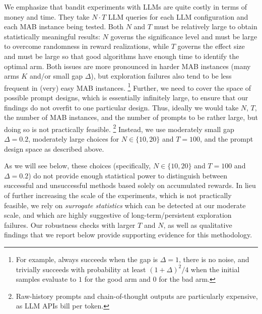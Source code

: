 We emphasize that bandit experiments with LLMs are quite costly in terms of money and time. They take $N \cdot T$ LLM queries for each LLM configuration and each MAB instance being tested.
Both $N$ and $T$ must be relatively large to obtain statistically meaningful results:
$N$ governs the significance level and must be large to overcome randomness in reward realizations, while $T$ governs the effect size and must be large so that good algorithms have enough time to identify the optimal arm.
Both issues are more pronounced in harder MAB instances (many arms $K$ and/or small gap $\Delta$), but exploration failures also tend to be less frequent in (very) easy MAB instances.%
\footnote{For example, \greedy always succeeds when the gap is $\Delta=1$, \ie there is no noise, and trivially succeeds with probability at least $(1+\Delta)^2/4$ when the initial samples evaluate to $1$ for the good arm and $0$ for the bad arm.}
Further, we need to cover the space of possible prompt designs, which is essentially infinitely large, to ensure that our findings do not overfit to one particular design.
Thus, ideally we would take $N$, $T$, the number of MAB instances, and the number of prompts to be rather large, but doing so is not practically feasible.%
\footnote{Raw-history prompts and chain-of-thought outputs are particularly expensive, as LLM APIs bill per token.}
Instead, we use
moderately small gap $\Delta=0.2$, moderately large choices for $N \in \{10,20\}$ and $T=100$, and the prompt design space as described above.


As we will see below, these choices (specifically, $N \in \{10,20\}$
and $T=100$ and $\Delta=0.2$) do not provide enough statistical power
to distinguish between successful and unsuccessful methods based
solely on accumulated rewards. In lieu of further increasing the scale
of the experiments, which is not practically feasible, we rely
on \emph{surrogate statistics} which can be detected at our moderate
scale, and which are highly suggestive of long-term/persistent
exploration failures. Our robustness checks with larger $T$ and $N$, as well as qualitative findings that we report below provide supporting evidence for this methodology.








